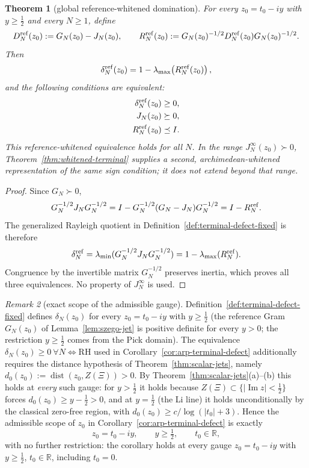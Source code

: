 \documentclass[11pt]{amsart}
\newtheorem{theorem}{Theorem}[section]
\theoremstyle{definition}
\theoremstyle{remark}
\newtheorem{remark}[theorem]{Remark}
\theoremstyle{definition}
\renewcommand{\Im}{\operatorname{Im}}
\newcommand{\half}{\tfrac{1}{2}}
\newcommand{\R}{\mathbb{R}}
\begin{document}
\begin{theorem}[global reference-whitened domination]\label{thm:reference-whitened-terminal}
For every $z_0=t_0-iy$ with $y\ge\half$ and every $N\ge1$, define
\[
   D_N^{\rm ref}(z_0):=G_N(z_0)-J_N(z_0),
   \qquad
   R_N^{\rm ref}(z_0):=
   G_N(z_0)^{-1/2}D_N^{\rm ref}(z_0)G_N(z_0)^{-1/2}.
\]
Then
\[
   \delta_N^{\rm ref}(z_0)
   =1-\lambda_{\max}\!\left(R_N^{\rm ref}(z_0)\right),
\]
and the following conditions are equivalent:
\[
\begin{aligned}
   \delta_N^{\rm ref}(z_0)&\ge0,\\
   J_N(z_0)&\succeq0,\\
   R_N^{\rm ref}(z_0)&\preceq I.
\end{aligned}
\]
This reference-whitened equivalence holds for all $N$.  In the range
$J_N^\infty(z_0)\succ0$, Theorem~\ref{thm:whitened-terminal} supplies a second, archimedean-whitened
representation of the same sign condition; it does not extend beyond that range.
\end{theorem}

\begin{proof}
Since $G_N\succ0$,
\[
   G_N^{-1/2}J_NG_N^{-1/2}
   =I-G_N^{-1/2}(G_N-J_N)G_N^{-1/2}
   =I-R_N^{\rm ref}.
\]
The generalized Rayleigh quotient in Definition~\ref{def:terminal-defect-fixed} is therefore
\[
   \delta_N^{\rm ref}
   =\lambda_{\min}(G_N^{-1/2}J_NG_N^{-1/2})
   =1-\lambda_{\max}(R_N^{\rm ref}).
\]
Congruence by the invertible matrix $G_N^{-1/2}$ preserves inertia, which proves all three
equivalences.  No property of $J_N^\infty$ is used.
\end{proof}

\begin{remark}[exact scope of the admissible gauge]\label{rmk:defect-scope}
Definition~\ref{def:terminal-defect-fixed} defines $\delta_N(z_0)$ for every $z_0=t_0-iy$ with
$y\ge\half$ (the reference Gram $G_N(z_0)$ of Lemma~\ref{lem:szego-jet} is positive definite for
every $y>0$; the restriction $y\ge\half$ comes from the Pick domain).  The equivalence
$\delta_N(z_0)\ge0\ \forall N\iff\mathrm{RH}$ used in
Corollary~\ref{cor:arp-terminal-defect} additionally requires the distance hypothesis of
Theorem~\ref{thm:scalar-jets}, namely $d_0(z_0):=\operatorname{dist}(z_0,Z(\Xi))>0$.  By
Theorem~\ref{thm:scalar-jets}(a)--(b) this holds at \emph{every} such gauge: for $y>\half$ it holds
because $Z(\Xi)\subset\{|\Im z|<\half\}$ forces $d_0(z_0)\ge y-\half>0$, and at $y=\half$ (the Li line)
it holds unconditionally by the classical zero-free region, with $d_0(z_0)\ge c/\log(|t_0|+3)$.  Hence the admissible
scope of $z_0$ in Corollary~\ref{cor:arp-terminal-defect} is exactly
\[
   z_0=t_0-iy,\qquad y\ge\half,\qquad t_0\in\R,
\]
with no further restriction: the corollary holds at every gauge $z_0=t_0-iy$ with $y\ge\half$,
$t_0\in\R$, including $t_0=0$.
\end{remark}
\end{document}
